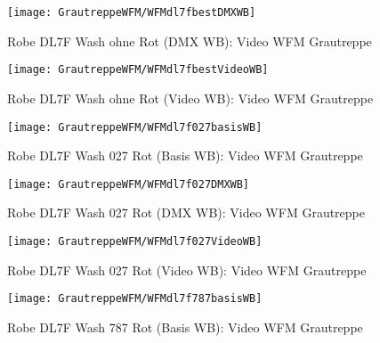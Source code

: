 \documentclass[pagesize,paper=A4,fontsize=12pt,utf8,numbers=noenddot,bibliography=totoc,listof=totoc,DIV=11,BCOR=1mm]{scrreprt}
\begin{document}
\begin{figure}[htp]     %
\centering
\texttt{[image: GrautreppeWFM/WFMdl7fbestDMXWB]} 
\caption {Robe DL7F Wash ohne Rot (DMX WB): Video WFM Grautreppe} 
\end{figure}

\begin{figure}[htp]     %
\centering
\texttt{[image: GrautreppeWFM/WFMdl7fbestVideoWB]} 
\caption {Robe DL7F Wash ohne Rot (Video WB): Video WFM Grautreppe} 
\end{figure}



\begin{figure}[htp]     %
\centering
\texttt{[image: GrautreppeWFM/WFMdl7f027basisWB]} 
\caption {Robe DL7F Wash 027 Rot (Basis WB): Video WFM Grautreppe} 
\end{figure}

\begin{figure}[htp]     %
\centering
\texttt{[image: GrautreppeWFM/WFMdl7f027DMXWB]} 
\caption {Robe DL7F Wash 027 Rot (DMX WB): Video WFM Grautreppe} 
\end{figure}

\begin{figure}[htp]     %
\centering
\texttt{[image: GrautreppeWFM/WFMdl7f027VideoWB]} 
\caption {Robe DL7F Wash 027 Rot (Video WB): Video WFM Grautreppe} 
\end{figure}



\begin{figure}[htp]     %
\centering
\texttt{[image: GrautreppeWFM/WFMdl7f787basisWB]} 
\caption {Robe DL7F Wash 787 Rot (Basis WB): Video WFM Grautreppe} 
\end{figure}
\end{document}
